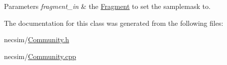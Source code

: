 \begin{DoxyParams}{Parameters}
{\em fragment\+\_\+in} & the \hyperlink{struct_fragment}{Fragment} to set the samplemask to. \\
\hline
\end{DoxyParams}


The documentation for this class was generated from the following files\+:\begin{DoxyCompactItemize}
\item 
necsim/\hyperlink{_community_8h}{Community.\+h}\item 
necsim/\hyperlink{_community_8cpp}{Community.\+cpp}\end{DoxyCompactItemize}
